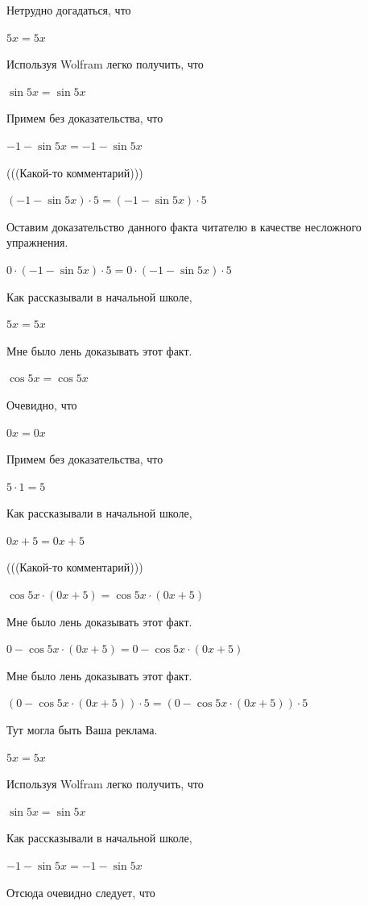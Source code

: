 \documentclass[12pt,a4paper,fleqn]{article}
\theoremstyle{definition}
\begin{document}
Нетрудно догадаться, что 

$ 5  x  =  5  x $

Используя Wolfram легко получить, что 

$\sin 5  x  = \sin 5  x $

Примем без доказательства, что 

$ -1  - \sin 5  x  =  -1  - \sin 5  x $

(((Какой-то комментарий))) 

$( -1  - \sin 5  x ) \cdot  5  = ( -1  - \sin 5  x ) \cdot  5 $

Оставим доказательство данного факта читателю в качестве несложного упражнения. 

$ 0  \cdot ( -1  - \sin 5  x ) \cdot  5  =  0  \cdot ( -1  - \sin 5  x ) \cdot  5 $

Как рассказывали в начальной школе, 

$ 5  x  =  5  x $

Мне было лень доказывать этот факт.

$\cos 5  x  = \cos 5  x $

Очевидно, что 

$ 0  x  =  0  x $

Примем без доказательства, что 

$ 5  \cdot  1  =  5 $

Как рассказывали в начальной школе, 

$ 0  x  +  5  =  0  x  +  5 $

(((Какой-то комментарий))) 

$\cos 5  x  \cdot ( 0  x  +  5 ) = \cos 5  x  \cdot ( 0  x  +  5 )$

Мне было лень доказывать этот факт.

$ 0  - \cos 5  x  \cdot ( 0  x  +  5 ) =  0  - \cos 5  x  \cdot ( 0  x  +  5 )$

Мне было лень доказывать этот факт.

$( 0  - \cos 5  x  \cdot ( 0  x  +  5 )) \cdot  5  = ( 0  - \cos 5  x  \cdot ( 0  x  +  5 )) \cdot  5 $

Тут могла быть Ваша реклама. 

$ 5  x  =  5  x $

Используя Wolfram легко получить, что 

$\sin 5  x  = \sin 5  x $

Как рассказывали в начальной школе, 

$ -1  - \sin 5  x  =  -1  - \sin 5  x $

Отсюда очевидно следует, что 
\end{document}
